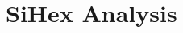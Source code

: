 \documentclass{notebook}
\author{Alessia Maggi}
\begin{document}
\frontmatter
\maketitle

%
\tableofcontents

\mainmatter
\onehalfspacing
\chapter{SiHex Analysis}


%
%
%
%



%


\end{document}
